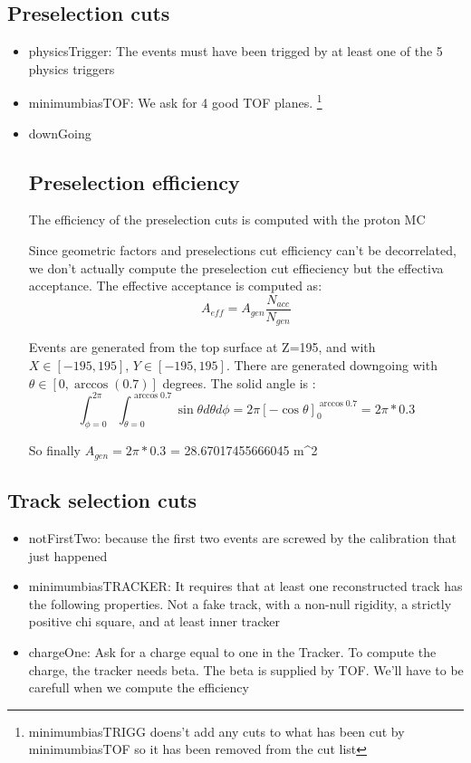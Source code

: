 \documentclass[fleqn,twoside]{article}
\begin{document}
\subsection{Preselection cuts}
\begin{itemize}
\item physicsTrigger: The events must have been trigged by at least one of the 5 physics triggers
\item minimumbiasTOF: We ask for 4 good TOF planes. 
  \footnote{minimumbiasTRIGG doens't add any cuts to what has been cut by minimumbiasTOF so it has been removed from the cut list}
\item downGoing

\subsection{Preselection efficiency}
The efficiency of the preselection cuts is computed with the proton MC

Since geometric factors and preselections cut efficiency can't be decorrelated, we don't actually compute the preselection cut effieciency but the effectiva acceptance.
The effective acceptance is computed as:
\begin{equation}
  A_{eff} = A_{gen} \frac{N_{acc}}{N_{gen}}
\end{equation}

Events are generated from the top surface at Z=195, and with $X \in [-195,195]$, $Y \in [-195,195]$.
There are generated downgoing with $\theta \in [0,\arccos(0.7)]$ degrees.
The solid angle is :
\begin{equation}
  \int_{\phi = 0}^{2 \pi}   \int_{\theta = 0}^{\arccos 0.7} \sin \theta d\theta d\phi = 2 \pi \left[ - \cos \theta \right]_{0}^{\arccos 0.7} = 2 \pi *  0.3
\end{equation}

So finally $A_{gen} = 2 \pi * 0.3 $ = 28.67017455666045 m^2

\end{itemize}

\subsection{Track selection cuts}
\begin{itemize}
\item notFirstTwo: because the first two events are screwed by the calibration that just happened
\item minimumbiasTRACKER:
  It requires that at least one reconstructed track has the following properties.
  Not a fake track, with a non-null rigidity, a strictly positive chi square, and at least inner tracker
\item chargeOne:
  Ask for a charge equal to one in the Tracker. To compute the charge, the tracker needs beta. The beta is supplied by TOF.
  We'll have to be carefull when we compute the efficiency
\end{itemize}
\end{document}
